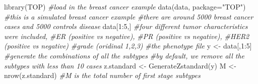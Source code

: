 \documentclass[11pt,]{article}
\newenvironment{Shaded}{\begin{snugshade}}{\end{snugshade}}
\newcommand{\AttributeTok}[1]{\textcolor[rgb]{0.77,0.63,0.00}{#1}}
\newcommand{\CommentTok}[1]{\textcolor[rgb]{0.56,0.35,0.01}{\textit{#1}}}
\newcommand{\DecValTok}[1]{\textcolor[rgb]{0.00,0.00,0.81}{#1}}
\newcommand{\FunctionTok}[1]{\textcolor[rgb]{0.00,0.00,0.00}{#1}}
\newcommand{\NormalTok}[1]{#1}
\newcommand{\OtherTok}[1]{\textcolor[rgb]{0.56,0.35,0.01}{#1}}
\newcommand{\SpecialCharTok}[1]{\textcolor[rgb]{0.00,0.00,0.00}{#1}}
\newcommand{\StringTok}[1]{\textcolor[rgb]{0.31,0.60,0.02}{#1}}
\begin{document}
\begin{Shaded}
\begin{Highlighting}[]
\FunctionTok{library}\NormalTok{(TOP)}
\CommentTok{\#load in the breast cancer example}
\FunctionTok{data}\NormalTok{(data, }\AttributeTok{package=}\StringTok{"TOP"}\NormalTok{)}
\CommentTok{\#this is a simulated breast cancer example}
\CommentTok{\#there are around 5000 breast cancer cases and 5000 controls disease}
\NormalTok{data[}\DecValTok{1}\SpecialCharTok{:}\DecValTok{5}\NormalTok{,]}
\CommentTok{\#four different tumor characteristics were included, }
\CommentTok{\#ER (positive vs negative), }
\CommentTok{\#PR (positive vs negative),}
\CommentTok{\#HER2 (positive vs negative)}
\CommentTok{\#grade (oridinal 1,2,3)}
\CommentTok{\#the phenotype file}
\NormalTok{y }\OtherTok{\textless{}{-}}\NormalTok{ data[,}\DecValTok{1}\SpecialCharTok{:}\DecValTok{5}\NormalTok{]}
\CommentTok{\#generate the combinations of all the subtypes}
\CommentTok{\#by default, we remove all the subtypes with less than 10 cases}
\NormalTok{z.standard }\OtherTok{\textless{}{-}} \FunctionTok{GenerateZstandard}\NormalTok{(y)}
\NormalTok{M }\OtherTok{\textless{}{-}} \FunctionTok{nrow}\NormalTok{(z.standard) }\CommentTok{\#M is the total number of first stage subtypes}


\end{Highlighting}
\end{Shaded}
\end{document}
